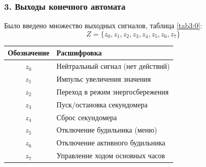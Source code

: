 \documentclass[11pt,a4paper,final]{article}
\begin{document}
	\subsubsection*{3. Выходы конечного автомата}
	
	Было введено множество выходных сигналов, таблица \ref{tab3:0}:
	\[
	Z = \{z_0, z_1, z_2, z_3, z_4, z_5, z_6, z_7\}
	\]
	
	\begin{center}
		\label{tab3:0}
		\small
		\begin{tabular}{|c|l|}
			\hline
			Обозначение & Расшифровка \\
			\hline
			\(z_0\) & Нейтральный сигнал (нет действий) \\
			\(z_1\) & Импульс увеличения значения  \\
			\(z_2\) & Переход в режим энергосбережения  \\
			\(z_3\) & Пуск/остановка секундомера  \\
			\(z_4\) & Сброс секундомера  \\
			\(z_5\) & Отключение будильника (меню)  \\
			\(z_6\) & Отключение активного будильника \\
			\(z_7\) & Управление ходом основных часов \\
			\hline
		\end{tabular}
	\end{center}
	
\end{document}
